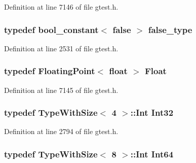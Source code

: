 \-Definition at line 7146 of file gtest.\-h.

\hypertarget{namespacetesting_1_1internal_a6fd572a03d56d5b60cf459268a055e4c}{
\subsubsection[{false\-\_\-type}]{\setlength{\rightskip}{0pt plus 5cm}typedef {\bf bool\-\_\-constant}$<$ false $>$ {\bf false\-\_\-type}}}\label{d0/da7/namespacetesting_1_1internal_a6fd572a03d56d5b60cf459268a055e4c}


\-Definition at line 2531 of file gtest.\-h.

\hypertarget{namespacetesting_1_1internal_ac9c0c59007cb41f8937e5adbef20b1e8}{
\subsubsection[{\-Float}]{\setlength{\rightskip}{0pt plus 5cm}typedef {\bf \-Floating\-Point}$<$ float $>$ {\bf \-Float}}}\label{d0/da7/namespacetesting_1_1internal_ac9c0c59007cb41f8937e5adbef20b1e8}


\-Definition at line 7145 of file gtest.\-h.

\hypertarget{namespacetesting_1_1internal_a8d84339888eecdb29b3d8f7607af3ecc}{
\subsubsection[{\-Int32}]{\setlength{\rightskip}{0pt plus 5cm}typedef {\bf \-Type\-With\-Size}$<$ 4 $>$\-::\-Int {\bf \-Int32}}}\label{d0/da7/namespacetesting_1_1internal_a8d84339888eecdb29b3d8f7607af3ecc}


\-Definition at line 2794 of file gtest.\-h.

\hypertarget{namespacetesting_1_1internal_af808a02f2629fbe7daf70b8bded220f6}{
\subsubsection[{\-Int64}]{\setlength{\rightskip}{0pt plus 5cm}typedef {\bf \-Type\-With\-Size}$<$ 8 $>$\-::\-Int {\bf \-Int64}}}\label{d0/da7/namespacetesting_1_1internal_af808a02f2629fbe7daf70b8bded220f6}


